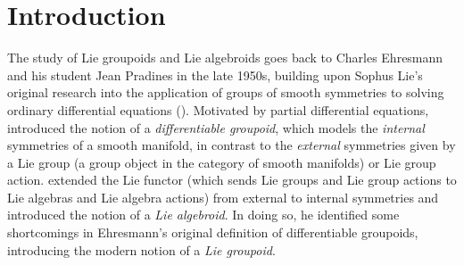 \chapter*{Introduction}


The study of Lie groupoids and Lie algebroids goes back to Charles Ehresmann and his student Jean Pradines in the late 1950s, building upon Sophus Lie's original research into the application of groups of smooth symmetries to solving ordinary differential equations (\cite{lie1893theorie}). Motivated by partial differential equations,  \cite{ehresmann1959categories} introduced the notion of a \emph{differentiable groupoid}, which models the \emph{internal} symmetries of a smooth manifold, in contrast to the \emph{external} symmetries given by a Lie group (a group object in the category of smooth manifolds) or Lie group action.  \cite{Pradines1967} extended the Lie functor (which sends Lie groups and Lie group actions to Lie algebras and Lie algebra actions) from external to internal symmetries and introduced the notion of a \emph{Lie algebroid}. In doing so, he identified some shortcomings in Ehresmann's original definition of differentiable groupoids, introducing the modern notion of a \emph{Lie groupoid}. 

